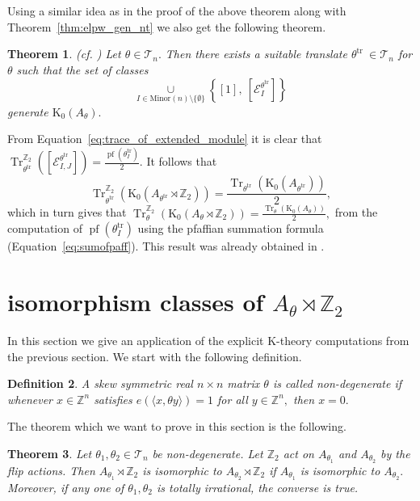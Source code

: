\documentclass[9pt, BCOR=2mm]{amsart}
\numberwithin{equation}{section}
\numberwithin{equation}{section}
\newtheorem{theorem}{Theorem}[section]
\newtheorem{definition}[theorem]{Definition}
\newcommand{\Z}{{\mathbb{Z}}}
\newcommand{\pf}{{\operatorname{pf}}}
\newcommand{\K}{\mathrm{K}} %
\DeclareMathOperator{\Tr}{Tr}
\begin{document}
Using a similar idea as in the proof of the above theorem along with Theorem~\ref{thm:elpw_gen_nt} we also get the following theorem.
	 
	  \begin{theorem}\label{thm:main_K_gen_proj_nt}(cf. \cite[Theorem 4.7]{Cha20}) Let $\theta \in \mathcal{T}_n.$ Then there exists a suitable translate $\theta^{\text {tr }} \in \mathcal{T}_n$ for $\theta$ such that the set of classes 
$$\underset{I\in \mathrm{Minor}(n)\setminus\{\emptyset\}}{\cup}\left\{[1], ~[\mathcal{E}_{I}^{\theta^\mathrm{tr}}] \right\}$$ generate $\K_0(A_{\theta}).$
	 \end{theorem}
	 
	 From Equation~\ref{eq:trace_of_extended_module} it is clear that 
$\Tr^{\Z_2}_{\theta^\mathrm{tr}}([\mathcal{E}_{I,J}^{\theta^\mathrm{tr}}])=\frac{\pf(\theta^\mathrm{tr}_I)}{2}.$ It follows that \begin{equation}\label{eq:trace_of_flipped}
\Tr^{\Z_2}_{\theta^\mathrm{tr}}(\K_0(A_{\theta^\mathrm{tr}}\rtimes \Z_2))=\frac{\Tr_{\theta^\mathrm{tr}}(\K_0(A_{\theta^\mathrm{tr}}))}{2},	
\end{equation} which in turn gives that 
$\Tr^{\Z_2}_{\theta}(\K_0(A_{\theta}\rtimes \Z_2))=\frac{\Tr_{\theta}(\K_0(A_{\theta}))}{2},$ from the computation of $\pf(\theta^\mathrm{tr}_I)$ using the pfaffian summation formula (Equation~\ref{eq:sumofpaff}). This result was already obtained in \cite[Example 4.5]{Cha21}.
	 
	
 
 
 \section{isomorphism classes of $A_\theta\rtimes \Z_2$}\label{sec:iso_classes}
 
 In this section we give an application of the explicit K-theory computations from the previous section. We start with the following definition.

\begin{definition}\label{def:nondegenerate}
\normalfont
	A skew symmetric real $n \times n$ matrix $\theta$ is called \emph{non-degenerate} if whenever $x \in \mathbb{Z}^{n}$ satisfies $e(\langle x, \theta y\rangle)=1$ for all $y \in \Z^n,$ then $x=0 .$ 
\end{definition}


The theorem which we want to prove in this section is the following. 

\begin{theorem}\label{thm:main_iso}
		Let $\theta_{1}, \theta_{2} \in \mathcal{T}_n $ be non-degenerate.
		Let $\Z_2$ act on $A_{\theta_{1}}$ and $A_{\theta_{2}}$ by the flip actions.  Then $A_{\theta_{1}}\rtimes \Z_2$ is isomorphic to $A_{\theta_{2}}\rtimes \Z_2$ if $A_{\theta_{1}}$ is isomorphic to $A_{\theta_{2}}.$ Moreover, if any one of $\theta_{1}, \theta_{2}$ is totally irrational, the converse is true.
 	 \end{theorem}
\end{document}
